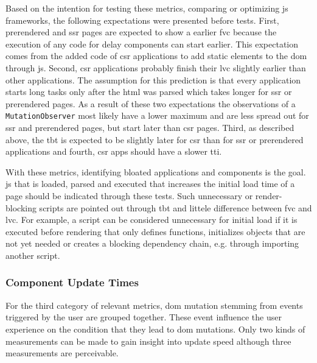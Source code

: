 \documentclass[a4paper, 10pt]{article}
\begin{document}
Based on the intention for testing these metrics, comparing or optimizing \acrlong{js} frameworks, the following expectations were presented before tests.
First, prerendered and \acrshort{ssr} pages are expected to show a earlier \acrshort{fvc} because the execution of any code for delay components can start earlier.
This expectation comes from the added code of \acrshort{csr} applications to add static elements to the \acrshort{dom} through \acrshort{js}.
Second, \acrshort{csr} applications probably finish their \acrshort{lvc} slightly earlier than other applications.
The assumption for this prediction is that every application starts long tasks only after the \acrshort{html} was parsed which takes longer for \acrshort{ssr} or prerendered pages.
As a result of these two expectations the observations of a \verb|MutationObserver| most likely have a lower maximum and are less spread out for \acrshort{ssr} and prerendered pages, but start later than \acrshort{csr} pages.
Third, as described above, the \acrshort{tbt} is expected to be slightly later for \acrshort{csr} than for \acrshort{ssr} or prerendered applications and fourth, \acrshort{csr} apps should have a slower \acrshort{tti}.

With these metrics, identifying bloated applications and components is the goal.
\acrlong{js} that is loaded, parsed and executed that increases the initial load time of a page should be indicated through these tests.
Such unnecessary or render-blocking scripts are pointed out through \acrshort{tbt} and littele difference between \acrshort{fvc} and \acrshort{lvc}.
For example, a script can be considered unnecessary for initial load if it is executed before rendering that only defines functions, initializes objects that are not yet needed or creates a blocking dependency chain, e.g. through importing another script.

\subsubsection{Component Update Times}\label{subsub:componentUpdateTimes}
% 

For the third category of relevant metrics, \acrshort{dom} mutation stemming from events triggered by the user are grouped together.
These event influence the user experience on the condition that they lead to \acrshort{dom} mutations.
Only two kinds of measurements can be made to gain insight into update speed although three measurements are perceivable.
\end{document}
